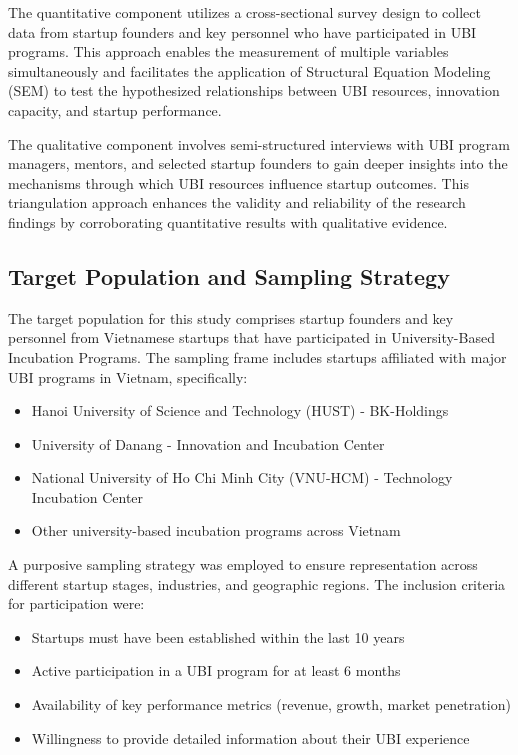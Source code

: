 \documentclass[../Main.tex]{subfiles}%
\begin{document}
	The quantitative component utilizes a cross-sectional survey design to collect data from startup founders and key personnel who have participated in UBI programs. This approach enables the measurement of multiple variables simultaneously and facilitates the application of Structural Equation Modeling (SEM) to test the hypothesized relationships between UBI resources, innovation capacity, and startup performance.
	
	The qualitative component involves semi-structured interviews with UBI program managers, mentors, and selected startup founders to gain deeper insights into the mechanisms through which UBI resources influence startup outcomes. This triangulation approach enhances the validity and reliability of the research findings by corroborating quantitative results with qualitative evidence.
	
	\subsection{Target Population and Sampling Strategy}
	The target population for this study comprises startup founders and key personnel from Vietnamese startups that have participated in University-Based Incubation Programs. The sampling frame includes startups affiliated with major UBI programs in Vietnam, specifically:
	
	\begin{itemize}
		\item Hanoi University of Science and Technology (HUST) - BK-Holdings
		\item University of Danang - Innovation and Incubation Center
		\item National University of Ho Chi Minh City (VNU-HCM) - Technology Incubation Center
		\item Other university-based incubation programs across Vietnam
	\end{itemize}
	
	A purposive sampling strategy was employed to ensure representation across different startup stages, industries, and geographic regions. The inclusion criteria for participation were:
	\begin{itemize}
		\item Startups must have been established within the last 10 years
		\item Active participation in a UBI program for at least 6 months
		\item Availability of key performance metrics (revenue, growth, market penetration)
		\item Willingness to provide detailed information about their UBI experience
	\end{itemize}
	
\end{document}
